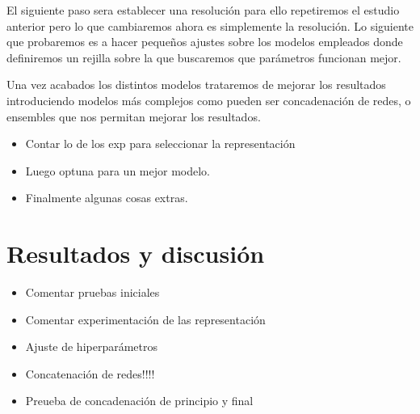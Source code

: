 \documentclass[a4paper,12pt,twoside,titlepage]{article}
\begin{document}
El siguiente paso sera establecer una resolución para ello repetiremos el estudio anterior pero lo que cambiaremos ahora es simplemente la resolución. Lo siguiente que probaremos es a hacer pequeños ajustes sobre los modelos empleados donde definiremos un rejilla sobre la que buscaremos que parámetros funcionan mejor.

Una vez acabados los distintos modelos trataremos de mejorar los resultados introduciendo modelos más complejos como pueden ser concadenación de redes, o ensembles que nos permitan mejorar los resultados.

\begin{itemize}
  \item Contar lo de los exp para seleccionar la representación
  \item Luego optuna para un mejor modelo.
  \item Finalmente algunas cosas extras.
\end{itemize}
\section{Resultados y discusión}
\begin{itemize}
  \item Comentar pruebas iniciales
  \item Comentar experimentación de las representación
  \item Ajuste de hiperparámetros
  \item Concatenación de redes!!!!
  \item Preueba de concadenación de principio y final
\end{itemize}
\end{document}
